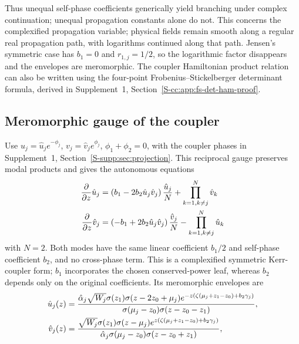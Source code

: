 \documentclass{optica-article}
\numberwithin{equation}{section}
\begin{document}
Thus unequal self-phase coefficients generically yield branching under complex continuation; unequal propagation constants alone do not.
This concerns the complexified propagation variable; physical fields remain smooth along a regular real propagation path, with logarithms continued along that path.
Jensen's symmetric case has $b_1=0$ and $r_{1,j}=1/2$, so the logarithmic factor disappears and the envelopes are meromorphic.
The coupler Hamiltonian product relation can also be written using the four-point Frobenius--Stickelberger determinant formula, derived in Supplement~1, Section~\ref*{S-cc:app:fs-det-ham-proof}.

\subsection{Meromorphic gauge of the coupler}
Use $u_j=\hat u_j e^{-\phi_j}$, $v_j=\hat v_j e^{\phi_j}$, $\phi_1+\phi_2=0$, with the coupler phases in Supplement~1, Section~\ref*{S-supp:sec:projection}.
This reciprocal gauge preserves modal products and gives the autonomous equations
\begin{align}
\frac{\partial}{\partial z} \hat{u}_j &= \left(b_1 - 2 b_2\hat{u}_j \hat{v}_j \right) \frac{\hat{u}_j}{N} + \prod\limits_{k=1, k \ne j}^{N} \hat{v}_k \notag \\
\frac{\partial}{\partial z} \hat{v}_j &= \left( - b_1 + 2 b_2\hat{u}_j \hat{v}_j\right) \frac{\hat{v}_j}{N} - \prod\limits_{k=1, k \ne j}^{N} \hat{u}_k \label{cc:eq:uv-hat-system}
\end{align}
with $N=2$.
Both modes have the same linear coefficient $b_1/2$ and self-phase coefficient $b_2$, and no cross-phase term.
This is a complexified symmetric Kerr-coupler form; $b_1$ incorporates the chosen conserved-power leaf, whereas $b_2$ depends only on the original coefficients.
Its meromorphic envelopes are
\begin{align}
\hat{u}_j{\left(z\right)} &= \frac{{\hat{\alpha}}_{j} \sqrt{W_j}\sigma{\left(z_{1}\right)} \sigma{\left(z - 2 z_{0} + {\mu}_{j}\right)} e^{-z\left(\zeta\left(\mu_j + z_1 - z_0\right) + b_2\gamma_j\right)} }{ \sigma{\left({\mu}_{j} - z_{0}\right)} \sigma{\left(z - z_{0} - z_{1}\right)}}, \notag \\
\hat{v}_j{\left(z\right)} &= \frac{\sqrt{W_j}\sigma{\left(z_{1}\right)} \sigma{\left(z - {\mu}_{j}\right)} e^{z\left(\zeta\left(\mu_j + z_1 - z_0\right) + b_2\gamma_j\right)}}{ {\hat{\alpha}}_{j} \sigma{\left({\mu}_{j} - z_{0}\right)} \sigma{\left(z - z_{0} + z_{1}\right)}}, \label{cc:eq:uhat-vhat-gauge-sols}
\end{align}
\end{document}
